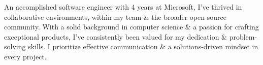 
\begin{cvparagraph}
An accomplished software engineer with 4 years at Microsoft,
I've thrived in collaborative environments, within my team \& the broader
open-source community. With a solid background in computer science \& a passion
for crafting exceptional products, I've consistently been valued for my dedication
\& problem-solving skills. I prioritize effective communication \& a solutions-driven
mindset in every project.
\end{cvparagraph}
